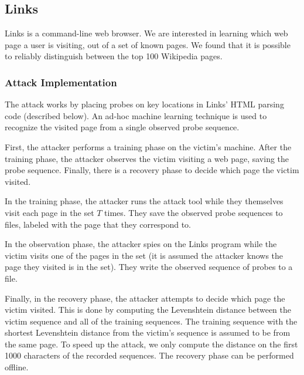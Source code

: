\documentclass[letterpaper,twocolumn,10pt]{article}
\begin{document}
\subsection{Links}

Links is a command-line web browser. We are interested in learning which web
page a user is visiting, out of a set of known pages. We found that it is
possible to reliably distinguish between the top 100 Wikipedia pages.

\subsubsection{Attack Implementation}

The attack works by placing probes on key locations in Links' HTML parsing code
(described below). An ad-hoc machine learning technique is used to recognize the
visited page from a single observed probe sequence.

First, the attacker performs a training phase on the victim's
machine.
After the training phase, the attacker observes the victim visiting a web page,
saving the probe sequence. Finally, there is a recovery phase to decide which
page the victim visited.

In the training phase, the attacker runs the attack tool while they themselves
visit each page in the set $T$ times. They save the observed probe sequences to
files, labeled with the page that they correspond to.

In the observation phase, the attacker spies on the Links program while the
victim visits one of the pages in the set (it is assumed the attacker knows the
page they visited is in the set). They write the observed sequence of probes to
a file.

Finally, in the recovery phase, the attacker attempts to decide which page the
victim visited. This is done by computing the Levenshtein distance
\cite{levenshtein1966binary} between the victim sequence and all of the training
sequences. The training sequence with the shortest Levenshtein distance from the
victim's sequence is assumed to be from the same page. To speed up the attack,
we only compute the distance on the first 1000 characters of the recorded
sequences. The recovery phase can be performed
offline.
\end{document}
